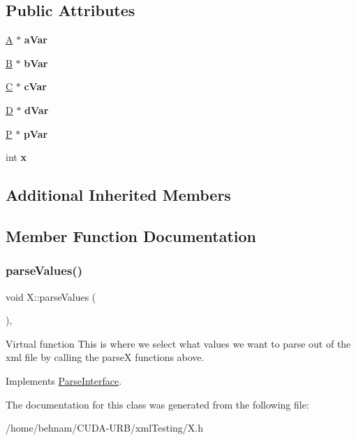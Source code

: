 \subsection*{Public Attributes}
\begin{DoxyCompactItemize}
\item 
\mbox{\label{classX_a2370d2f6fd5440bf742ac758d329ae53}} 
\hyperlink{classA}{A} $\ast$ {\bfseries a\+Var}
\item 
\mbox{\label{classX_afa6720354fe2a87c02283955f9054157}} 
\hyperlink{classB}{B} $\ast$ {\bfseries b\+Var}
\item 
\mbox{\label{classX_a462350abfcbb7aa3411cc323ca69ff3d}} 
\hyperlink{classC}{C} $\ast$ {\bfseries c\+Var}
\item 
\mbox{\label{classX_a9054178c4e8bd30504714f4464796557}} 
\hyperlink{classD}{D} $\ast$ {\bfseries d\+Var}
\item 
\mbox{\label{classX_aae69f92ec873d2f4325cb38bf1560608}} 
\hyperlink{classP}{P} $\ast$ {\bfseries p\+Var}
\item 
\mbox{\label{classX_a129a83c087a5e9dc2895ebf74bd2d39d}} 
int {\bfseries x}
\end{DoxyCompactItemize}
\subsection*{Additional Inherited Members}


\subsection{Member Function Documentation}
\mbox{\label{classX_a0d0aabf7efbe8356894613e58b736216}} 
\subsubsection{\texorpdfstring{parse\+Values()}{parseValues()}}
{\footnotesize\ttfamily void X\+::parse\+Values (\begin{DoxyParamCaption}{ }\end{DoxyParamCaption})\hspace{0.3cm}{\ttfamily [inline]}, {\ttfamily [virtual]}}

Virtual function This is where we select what values we want to parse out of the xml file by calling the parseX functions above. 

Implements \hyperlink{classParseInterface_afca32108192ba0997c9e5a78189b0cbc}{Parse\+Interface}.



The documentation for this class was generated from the following file\+:\begin{DoxyCompactItemize}
\item 
/home/behnam/\+C\+U\+D\+A-\/\+U\+R\+B/xml\+Testing/X.\+h\end{DoxyCompactItemize}
